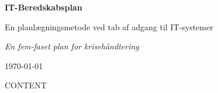 \documentclass[a4paper,11pt]{book}
\begin{document}
\begin{titlepage}
    \centering
    \vspace*{2cm}
    {\Huge\bfseries IT-Beredskabsplan\par}
    \vspace{1cm}
    {\Large En planlægningsmetode ved tab af adgang til IT-systemer\par}
    \vspace{2cm}
    
    \vspace{2cm}
    {\Large\itshape En fem-faset plan for krisehåndtering\par}
    \vfill
    
    {\large \today\par}
\end{titlepage}

\tableofcontents
\newpage

{{CONTENT}}
\end{document}

